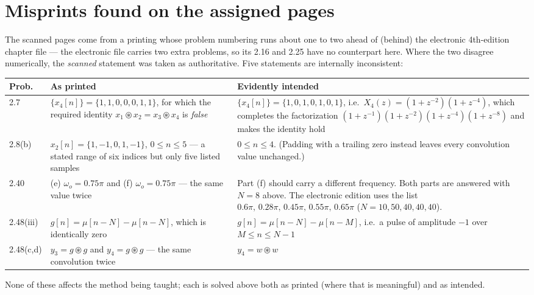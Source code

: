 \appendix
\section{Misprints found on the assigned pages}
\label{app:errata}

The scanned pages come from a printing whose problem numbering runs about one to two ahead of
(behind) the electronic 4th-edition chapter file --- the electronic file carries two extra
problems, so its 2.16 and 2.25 have no counterpart here. Where the two disagree numerically,
the \emph{scanned} statement was taken as authoritative. Five statements are internally
inconsistent:

\begin{center}
\renewcommand{\arraystretch}{1.6}
\begin{tabular}{@{}p{}p{}p{}@{}}
\toprule
\textbf{Prob.} & \textbf{As printed} & \textbf{Evidently intended}\\
\midrule
2.7 &
$\{x_4[n]\}=\{1,1,0,0,0,1,1\}$, for which the required identity
$x_1\circledast x_2=x_3\circledast x_4$ is \emph{false} &
$\{x_4[n]\}=\{1,0,1,0,1,0,1\}$, i.e.\ $X_4(z)=(1+z^{-2})(1+z^{-4})$, which completes the
factorization $(1+z^{-1})(1+z^{-2})(1+z^{-4})(1+z^{-8})$ and makes the identity hold\\
\midrule
2.8(b) &
$x_2[n]=\{1,-1,0,1,-1\}$, $0\le n\le 5$ --- a stated range of six indices but only five
listed samples &
$0\le n\le 4$. (Padding with a trailing zero instead leaves every convolution value
unchanged.)\\
\midrule
2.40 &
(e) $\omega_o=0.75\pi$ and (f) $\omega_o=0.75\pi$ --- the same value twice &
Part (f) should carry a different frequency. Both parts are answered with $N=8$ above. The
electronic edition uses the list $0.6\pi,\,0.28\pi,\,0.45\pi,\,0.55\pi,\,0.65\pi$
($N=10,50,40,40,40$).\\
\midrule
2.48(iii) &
$g[n]=\mu[n-N]-\mu[n-N]$, which is identically zero &
$g[n]=\mu[n-N]-\mu[n-M]$, i.e.\ a pulse of amplitude $-1$ over $M\le n\le N-1$\\
\midrule
2.48(c,d) &
$y_3=g\circledast g$ and $y_4=g\circledast g$ --- the same convolution twice &
$y_4=w\circledast w$\\
\bottomrule
\end{tabular}
\end{center}

None of these affects the method being taught; each is solved above both as printed (where
that is meaningful) and as intended.

